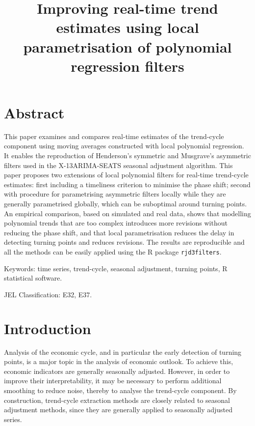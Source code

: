 \documentclass[
]{article}
\title{Improving real-time trend estimates using local parametrisation
of polynomial regression filters}
\author{}
\date{}
\newcommand\1{\mathds{1}}
\begin{document}
\maketitle

\section*{Abstract}\label{abstract}

This paper examines and compares real-time estimates of the trend-cycle
component using moving averages constructed with local polynomial
regression. It enables the reproduction of Henderson's symmetric and
Musgrave's asymmetric filters used in the X-13ARIMA-SEATS seasonal
adjustment algorithm. This paper proposes two extensions of local
polynomial filters for real-time trend-cycle estimates: first including
a timeliness criterion to minimise the phase shift; second with
procedure for parametrising asymmetric filters locally while they are
generally parametrised globally, which can be suboptimal around turning
points. An empirical comparison, based on simulated and real data, shows
that modelling polynomial trends that are too complex introduces more
revisions without reducing the phase shift, and that local
parametrisation reduces the delay in detecting turning points and
reduces revisions. The results are reproducible and all the methods can
be easily applied using the R package \texttt{rjd3filters}.

Keywords: time series, trend-cycle, seasonal adjustment, turning points,
R statistical software.

JEL Classification: E32, E37.

\section{Introduction}\label{introduction}

Analysis of the economic cycle, and in particular the early detection of
turning points, is a major topic in the analysis of economic outlook. To
achieve this, economic indicators are generally seasonally adjusted.
However, in order to improve their interpretability, it may be necessary
to perform additional smoothing to reduce noise, thereby to analyse the
trend-cycle component. By construction, trend-cycle extraction methods
are closely related to seasonal adjustment methods, since they are
generally applied to seasonally adjusted series.
\end{document}
